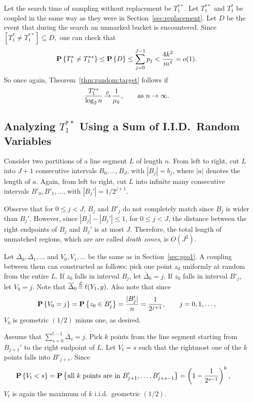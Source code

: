 \documentclass{article}
\newcommand{\Tss}{{T_1^{**}}}
\newcommand{\Th}{{{T}_1^*}}
\newcommand{\Thh}{{{T}_1^{**}}}
\newcommand{\oDelta}{{\overline{\Delta}}}
\newcommand\cL{{\cal L}}
\newcommand{\p}[1]{{\textbf P}\left\{#1\right\}}
\newcommand\inprobHIGH{\,{\buildrel p \over \rightarrow}\,}
\newcommand\inprob{{\inprobHIGH}}
\newcommand{\eql}{\,{\buildrel \cL \over =}\,}
\begin{document}
Let the search time of sampling without replacement be $\Thh$.  Let $\Thh$ and
$\Th$ be coupled in the same way as they were in Section~\ref{sec:replacement}.
Let $D$ be the event that during the search an unmarked bucket is encountered.
Since
$
\left[ \Th \ne \Thh \right] \subseteq D,
$
one can check that
\begin{align*}
    \p{\Th \ne \Thh}
    \le \p{D} \le \sum_{j=0}^{J-1} p_j
< \frac{4 k^2}{m^{4}} = o(1).
\end{align*}
So once again, Theorem~\ref{thm:random:target} follows if
$$
\frac {\Thh} {\log_2 n} \inprob \frac 1 {\mu_k}, \qquad \text{as } n \to
\infty.
$$

\subsection{Analyzing $\Tss$ Using a Sum of I.I.D.\ Random Variables}

Consider two partitions of a line segment $L$ of length $n$.  From left to
right, cut $L$ into $J+1$ consecutive intervals $B_0,\ldots,B_J$, with
$|B_j|=b_j$, where $|a|$ denotes the length of $a$.  Again, from left to right,
cut $L$ into infinite many consecutive intervals $B'_0, B'_1, \ldots$, with
$|B_j'|=1/2^{j+1}$. 

Observe that for $0 \le j < J$, $B_j$ and $B'_j$ do not completely match since
$B_j$ is wider than $B_j'$.  However, since $|B_j| - |B_j'| \le 1$, for $0 \le
j < J$, the distance between the right endpoints of $B_j$ and $B_j'$ is at most
$J$. Therefore, the total length of unmatched regions, which are are
called \emph{death zones}, is $O(J^{2})$.

Let $\oDelta_0, \oDelta_1,\ldots$ and $V_0,V_1,\ldots$ be the same as in
Section~\ref{sec:geo1}.  A coupling between them can constructed as follows: pick
one point $z_0$ uniformly at random from the entire $L$. If $z_0$ falls in
interval $B_j$, let $\oDelta_0 = j$. If $z_0$ falls in interval $B'_j$, let
$V_0 = j$.  Note that $\oDelta_0 \eql \ell(Y_1,y)$.  Also note that since
$$
\p{V_0 = j} = \p{z_0 \in B'_j} = \frac{|B'_j|}{n} = \frac{1}{2^{j+1}}, \qquad
j=0,1,\ldots,
$$
$V_0$ is geometric $(1/2)$ minus one, as desired.

Assume that $\sum_{s=0}^{t-1} \oDelta_s = j$. Pick $k$ points from the line
segment starting from $B_{j+1}'$ to the right endpoint of $L$.  Let $V_t = s$
such that the rightmost one of the $k$ points falls into $B'_{j+s}$. Since
\begin{align*}
\p{V_t < s} 
& = \p{\text{all $k$ points are in $B'_{j+1}, \ldots
,B'_{j+s-1}$}} 
= \left( 1-\frac{1}{2^{s-1}} \right)^k,
\end{align*}
$V_t$ is again the maximum of $k$ i.i.d.\ geometric $(1/2)$.
\end{document}
